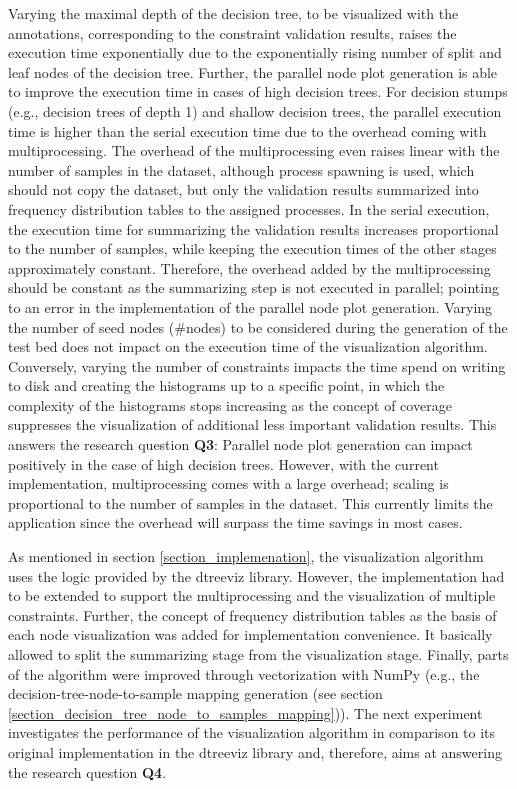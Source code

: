 Varying the maximal depth of the decision tree, to be visualized with the annotations, corresponding to the constraint validation results, raises the execution time exponentially due to the exponentially rising number of split and leaf nodes of the decision tree. Further, the parallel node plot generation is able to improve the execution time in cases of high decision trees. For decision stumps (e.g., decision trees of depth 1) and shallow decision trees, the parallel execution time is higher than the serial execution time due to the overhead coming with multiprocessing. The overhead of the multiprocessing even raises linear with the number of samples in the dataset, although process spawning is used, which should not copy the dataset, but only the validation results summarized into frequency distribution tables to the assigned processes. In the serial execution, the execution time for summarizing the validation results increases proportional to the number of samples, while keeping the execution times of the other stages approximately constant. Therefore, the overhead added by the multiprocessing should be constant as the summarizing step is not executed in parallel; pointing to an error in the implementation of the parallel node plot generation. Varying the number of seed nodes (\#nodes) to be considered during the generation of the test bed does not impact on the execution time of the visualization algorithm. Conversely, varying the number of constraints impacts the time spend on writing to disk and creating the histograms up to a specific point, in which the complexity of the histograms stops increasing as the concept of coverage suppresses the visualization of additional less important validation results. This answers the research question \textbf{Q3}: Parallel node plot generation can impact positively in the case of high decision trees. However, with the current implementation, multiprocessing comes with a large overhead; scaling is proportional to the number of samples in the dataset. This currently limits the application since the overhead will surpass the time savings in most cases. 

As mentioned in section \ref{section_implemenation}, the visualization algorithm uses the logic provided by the dtreeviz library. However, the implementation had to be extended to support the multiprocessing and the visualization of multiple constraints. Further, the concept of frequency distribution tables as the basis of each node visualization was added for implementation convenience. It basically allowed to split the summarizing stage from the visualization stage. Finally, parts of the algorithm were improved through vectorization with NumPy (e.g., the decision-tree-node-to-sample mapping generation (see section \ref{section_decision_tree_node_to_samples_mapping})). The next experiment investigates the performance of the visualization algorithm in comparison to its original implementation in the dtreeviz library and, therefore, aims at answering the research question \textbf{Q4}.


